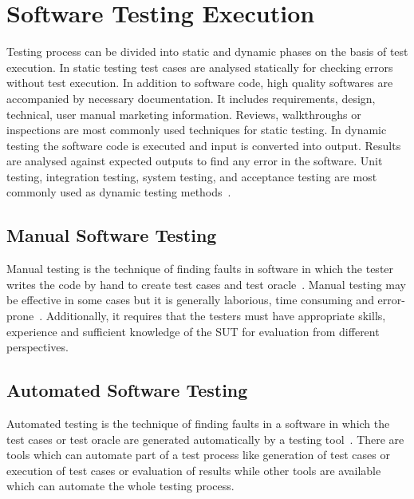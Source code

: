 \section{Software Testing Execution}
Testing process can be divided into static and dynamic phases on the basis of test execution. In static testing test cases are analysed statically for checking errors without test execution. In addition to software code, high quality softwares are accompanied by necessary documentation. It includes requirements, design, technical, user manual marketing information. Reviews, walkthroughs or inspections are most commonly used techniques for static testing. In dynamic testing the software code is executed and input is converted into output. Results are analysed against expected outputs to find any error in the software. Unit testing, integration testing, system testing, and acceptance testing are most commonly used as dynamic testing methods~\cite{fairley1978tutorial}.




\subsection{Manual Software Testing}
Manual testing is the technique of finding faults in software in which the tester writes the code by hand to create test cases and test oracle~\cite{Ciupa2008}. Manual testing may be effective in some cases but it is generally laborious, time consuming and error-prone~\cite{tretmans1999}. Additionally, it requires that the testers must have appropriate skills, experience and sufficient knowledge of the SUT for evaluation from different perspectives.
 
\subsection{Automated Software Testing}
Automated testing is the technique of finding faults in a software in which the test cases or test oracle are generated automatically by a testing tool~\cite{Leitner2007}. There are tools which can automate part of a test process like generation of test cases or execution of test cases or evaluation of results while other tools are available which can automate the whole testing process. 

